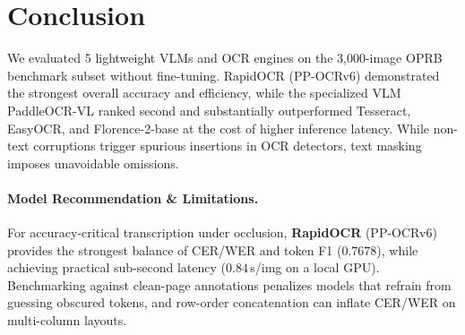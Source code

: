 \section{Conclusion}
\label{sec:conclusion}

We evaluated 5 lightweight VLMs and OCR engines on the 3,000-image OPRB benchmark subset without fine-tuning. RapidOCR (PP-OCRv6) demonstrated the strongest overall accuracy and efficiency, while the specialized VLM PaddleOCR-VL ranked second and substantially outperformed Tesseract, EasyOCR, and Florence-2-base at the cost of higher inference latency. While non-text corruptions trigger spurious insertions in OCR detectors, text masking imposes unavoidable omissions.

\paragraph{Model Recommendation \& Limitations.} For accuracy-critical transcription under occlusion, \textbf{RapidOCR} (PP-OCRv6) provides the strongest balance of CER/WER and token F1 ($0.7678$), while achieving practical sub-second latency ($0.84$\,s/img on a local GPU). Benchmarking against clean-page annotations penalizes models that refrain from guessing obscured tokens, and row-order concatenation can inflate CER/WER on multi-column layouts.
